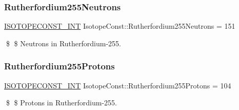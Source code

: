 \subsubsection{\texorpdfstring{Rutherfordium255\+Neutrons}{Rutherfordium255Neutrons}}
{\footnotesize\ttfamily \mbox{\hyperlink{group___isotope_const-_macros_ga5f18360b3e99483a35c32d789e62621c}{I\+S\+O\+T\+O\+P\+E\+C\+O\+N\+S\+T\+\_\+\+I\+NT}} Isotope\+Const\+::\+Rutherfordium255\+Neutrons = 151}

\$ \$ Neutrons in Rutherfordium-\/255. \mbox{\label{group___isotope_const-_rutherfordium-_rf255_ga3fbdfed55fa3b7fe59cafbbe04b5484a}} 
\subsubsection{\texorpdfstring{Rutherfordium255\+Protons}{Rutherfordium255Protons}}
{\footnotesize\ttfamily \mbox{\hyperlink{group___isotope_const-_macros_ga5f18360b3e99483a35c32d789e62621c}{I\+S\+O\+T\+O\+P\+E\+C\+O\+N\+S\+T\+\_\+\+I\+NT}} Isotope\+Const\+::\+Rutherfordium255\+Protons = 104}

\$ \$ Protons in Rutherfordium-\/255. 